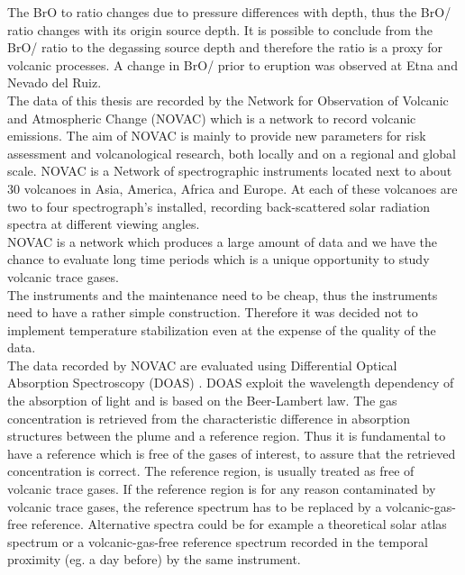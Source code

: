 The BrO to  ratio changes due to pressure differences with depth, thus the BrO/ ratio changes with its origin source depth. It is possible to conclude from the BrO/ ratio to the degassing source depth and therefore the ratio is a proxy for volcanic processes. A change in BrO/ prior to eruption was observed at Etna and Nevado del Ruiz.\\
%
\newline
%
The data of this thesis are recorded by the Network for Observation of Volcanic and Atmospheric Change (NOVAC) which is a network to record volcanic emissions. The aim of NOVAC is mainly to provide new parameters for risk assessment and volcanological research, both locally and on a regional and global scale.
NOVAC is a Network of spectrographic instruments located next to about 30 volcanoes in Asia, America, Africa and Europe. At each of these volcanoes are two to four spectrograph's installed, recording back-scattered solar radiation spectra at different viewing angles.\\
NOVAC is a network which produces a large amount of data and we have the chance to evaluate long time periods which is a unique opportunity to study volcanic trace gases.\\
The instruments and the maintenance need to be cheap, thus the instruments need to have a rather simple construction. Therefore it was decided not to implement temperature stabilization even at the expense of the quality of the data.\\
%
\newline
%
The data recorded by NOVAC are evaluated using Differential Optical Absorption Spectroscopy (DOAS) \cite{platt2008differential}. DOAS exploit the wavelength dependency of the absorption of light and is based on the Beer-Lambert law. The gas concentration is retrieved from the characteristic difference in absorption structures between the plume and a reference region. Thus it is fundamental to have a reference which is free of the gases of interest, to assure that the retrieved concentration is correct.
%
\newline
%
The reference region, is usually treated as free of
volcanic trace gases. If the reference region is for any reason
contaminated by volcanic trace gases, the reference spectrum has to be
replaced by a volcanic-gas-free reference. Alternative spectra could be for example a
theoretical solar atlas spectrum or a volcanic-gas-free reference
spectrum recorded in the temporal proximity (eg. a day before) by the same instrument.
